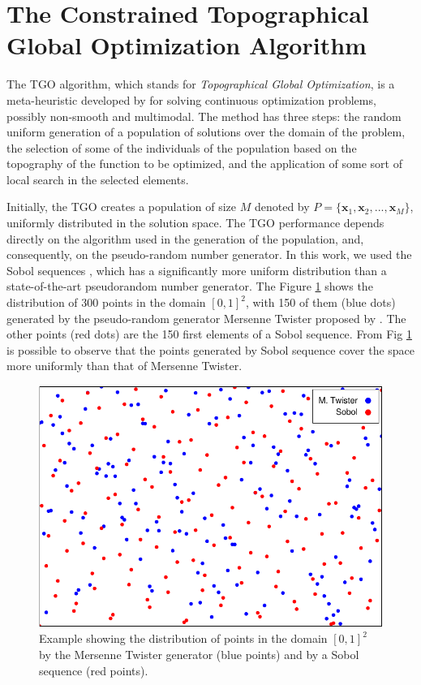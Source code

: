 \section{The Constrained Topographical Global Optimization Algorithm}\label{sec:Methods}

The TGO algorithm, which stands for \textit{Topographical Global Optimization}, is a meta-heuristic developed by \cite{ITGO1} for solving continuous optimization problems, possibly non-smooth and multimodal. The method has three steps: the random uniform generation of a population of solutions over the domain of the problem, the selection of some of the individuals of the population based on the topography of the function to be optimized, and the application of some sort of local search in the selected elements.

Initially, the TGO creates a population of size $M$ denoted by $P = \{\bm{x}_1, \bm{x}_2, ..., \allowbreak \bm{x}_M\}$, uniformly distributed in the solution space. The TGO performance depends directly on the algorithm used in the generation of the population, and, consequently, on the pseudo-random number generator. In this work, we used the Sobol sequences \citep{Sobol, ITGO3}, which has a significantly more uniform distribution than a state-of-the-art pseudorandom number generator. The Figure \ref{fig:Sobol} shows the distribution of 300 points in the domain $[0, 1]^2$, with 150 of them (blue dots) generated by the pseudo-random generator Mersenne Twister proposed by \cite{mt19937}. The other points (red dots) are the 150 first elements of a Sobol sequence. From Fig \ref{fig:Sobol} is possible to observe that the points generated by Sobol sequence cover the space more uniformly than that of Mersenne Twister.


\begin{figure}[h]
\begin{center}
\includegraphics[scale=0.8]{scatter-crop.pdf}
\end{center}
\captionsetup{justification=centering}
\caption{Example showing the distribution of points in the domain $[0, 1]^2$ by the Mersenne Twister generator (blue points) and by a Sobol sequence (red points). }\label{fig:Sobol}
\end{figure}


